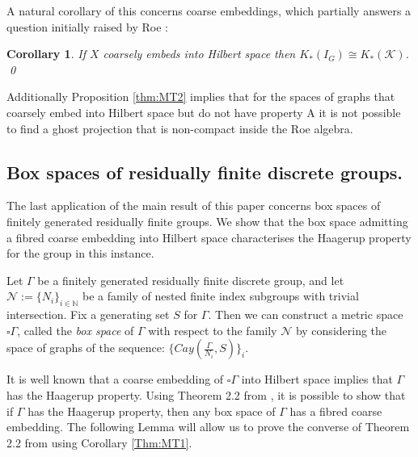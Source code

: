 \documentclass[11pt]{amsart}
\theoremstyle{plain}
\newtheorem{corollary}[theorem]{Corollary}%
\theoremstyle{definition}%
\theoremstyle{remark}%
\begin{document}
{A natural corollary of this concerns coarse embeddings, which partially answers a question initially raised by Roe \cite[Chapter 11]{MR2007488}:

\begin{corollary}\label{thm:IT3}
If $X$ coarsely embeds into Hilbert space then $K_{*}(I_{G}) \cong K_{*}(\mathcal{K})$. \qed
\end{corollary}

Additionally Proposition \ref{thm:MT2} implies that for the spaces of graphs that coarsely embed into Hilbert space but do not have property A \cite{MR2899681,MR2920843} it is not possible to find a ghost projection that is non-compact inside the Roe algebra. 

\subsection{Box spaces of residually finite discrete groups.}
The last application of the main result of this paper concerns box spaces of finitely generated residually finite groups. We show that the box space admitting a fibred coarse embedding into Hilbert space characterises the Haagerup property for the group in this instance. 

Let $\Gamma$ be a finitely generated residually finite discrete group, and let $\mathcal{N}:=\lbrace N_{i} \rbrace_{i\in\mathbb{N}}$ be a family of nested finite index subgroups with trivial intersection. Fix a generating set $S$ for $\Gamma$. Then we can construct a metric space $\square \Gamma$, called the \textit{box space} of $\Gamma$ with respect to the family $\mathcal{N}$ by considering the space of graphs of the sequence: $\lbrace Cay(\frac{\Gamma}{N_{i}},S) \rbrace_{i}$. 

It is well known \cite[Proposition 11.26]{MR2007488} that a coarse embedding of $\square \Gamma$ into Hilbert space implies that $\Gamma$ has the Haagerup property. Using Theorem 2.2 from \cite{FCEpaper}, it is possible to show that if $\Gamma$ has the Haagerup property, then any box space of $\Gamma$ has a fibred coarse embedding. The following Lemma will allow us to prove the converse of Theorem 2.2 from \cite{FCEpaper} using Corollary \ref{Thm:MT1}.

}
\end{document}
